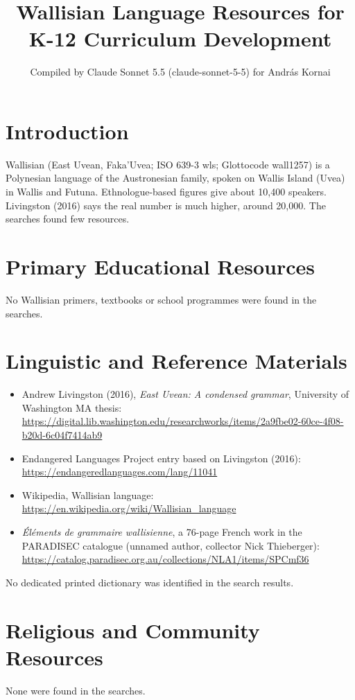 \documentclass[12pt]{article}
\title{Wallisian Language Resources for K-12 Curriculum Development}
\author{Compiled by Claude Sonnet 5.5 (claude-sonnet-5-5) for Andr\'as Kornai}
\date{}
\begin{document}
\maketitle

\section{Introduction}
Wallisian (East Uvean, Faka'Uvea; ISO 639-3 wls; Glottocode wall1257) is a Polynesian language of the Austronesian family, spoken on Wallis Island (\textquotesingle Uvea) in Wallis and Futuna. Ethnologue-based figures give about 10,400 speakers. Livingston (2016) says the real number is much higher, around 20,000. The searches found few resources.

\section{Primary Educational Resources}
No Wallisian primers, textbooks or school programmes were found in the searches.

\section{Linguistic and Reference Materials}
\begin{itemize}
\item Andrew Livingston (2016), \emph{East Uvean: A condensed grammar}, University of Washington MA thesis: \url{https://digital.lib.washington.edu/researchworks/items/2a9fbe02-60ce-4f08-b20d-6c04f7414ab9}
\item Endangered Languages Project entry based on Livingston (2016): \url{https://endangeredlanguages.com/lang/11041}
\item Wikipedia, Wallisian language: \url{https://en.wikipedia.org/wiki/Wallisian_language}
\item \emph{\'El\'ements de grammaire wallisienne}, a 76-page French work in the PARADISEC catalogue (unnamed author, collector Nick Thieberger): \url{https://catalog.paradisec.org.au/collections/NLA1/items/SPCmf36}
\end{itemize}
No dedicated printed dictionary was identified in the search results.

\section{Religious and Community Resources}
None were found in the searches.
\end{document}
